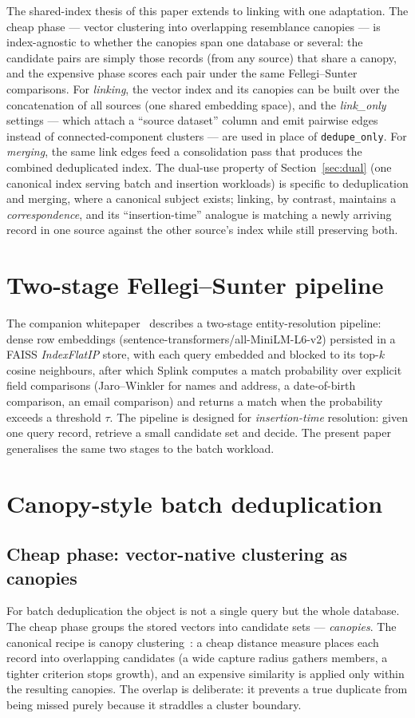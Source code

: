 \documentclass[11pt]{article}
\begin{document}
The shared-index thesis of this paper extends to linking with one adaptation. The cheap phase
--- vector clustering into overlapping resemblance canopies --- is index-agnostic to whether
the canopies span one database or several: the candidate pairs are simply those records (from
any source) that share a canopy, and the expensive phase scores each pair under the same
Fellegi--Sunter comparisons. For \emph{linking}, the vector index and its canopies can be
built over the concatenation of all sources (one shared embedding space), and the
\emph{link\_only} settings --- which attach a ``source dataset'' column and emit pairwise
edges instead of connected-component clusters --- are used in place of \texttt{dedupe\_only}.
For \emph{merging}, the same link edges feed a consolidation pass that produces the combined
deduplicated index. The dual-use property of Section~\ref{sec:dual} (one canonical index
serving batch and insertion workloads) is specific to deduplication and merging, where a
canonical subject exists; linking, by contrast, maintains a \emph{correspondence}, and its
``insertion-time'' analogue is matching a newly arriving record in one source against the
other source's index while still preserving both.

\section{Two-stage Fellegi--Sunter pipeline}
\label{sec:fs}
The companion whitepaper~\cite{pipeline} describes a two-stage entity-resolution pipeline:
dense row embeddings (sentence-transformers/all-MiniLM-L6-v2) persisted in a FAISS
\emph{IndexFlatIP} store, with each query embedded and blocked to its top-$k$ cosine
neighbours, after which Splink computes a match probability over explicit field comparisons
(Jaro--Winkler for names and address, a date-of-birth comparison, an email comparison) and
returns a match when the probability exceeds a threshold $\tau$. The pipeline is designed for
\emph{insertion-time} resolution: given one query record, retrieve a small candidate set and
decide. The present paper generalises the same two stages to the batch workload.

\section{Canopy-style batch deduplication}
\label{sec:canopy}

\subsection{Cheap phase: vector-native clustering as canopies}
For batch deduplication the object is not a single query but the whole database. The cheap
phase groups the stored vectors into candidate sets --- \emph{canopies}. The canonical recipe
is canopy clustering~\cite{mccallum2000}: a cheap distance measure places each record into
overlapping candidates (a wide capture radius gathers members, a tighter criterion stops
growth), and an expensive similarity is applied only within the resulting canopies. The
overlap is deliberate: it prevents a true duplicate from being missed purely because it
straddles a cluster boundary.
\end{document}
